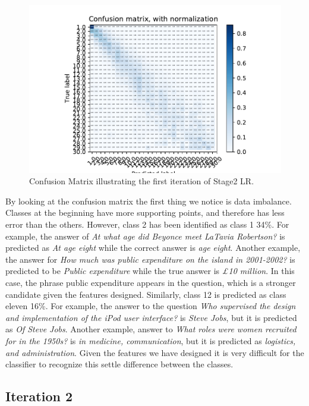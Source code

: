 \begin{figure}
  \includegraphics[scale=1]{../Figures/fig_iter1.pdf} \centering
  \caption{Confusion Matrix illustrating the first iteration of Stage2 LR. }
\end{figure} 



By looking at the confusion matrix the first thing we notice is data imbalance. Classes at the beginning have more supporting points, and therefore has less error than the others. However, class 2 has been identified as class 1 34\%. For example, the answer of \textit{At what age did Beyonce meet LaTavia Robertson?} is predicted as \textit{At age eight} while the correct answer is \textit{age eight}. Another example, the answer for \textit{How much was public expenditure on the island in 2001-2002?} is predicted to be \textit{Public expenditure} while the true answer is \textit{£10 million}. In this case, the phrase public expenditure appears in the question, which is a stronger candidate given the features designed. Similarly, class 12 is predicted as class eleven 16\%. For example, the answer to the question \textit{Who supervised the design and implementation of the iPod user interface?} is \textit{Steve Jobs}, but it is predicted as \textit{Of Steve Jobs}. Another example, answer to \textit{What roles were women recruited for in the 1950s?} is \textit{in medicine, communication}, but it is predicted as \textit{logistics, and administration}. Given the features we have designed it is very difficult for the classifier to recognize this settle difference between the classes. 


\subsection{Iteration 2}

